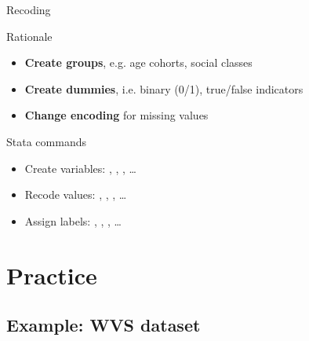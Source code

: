 \documentclass[t]{beamer}
\begin{document}
	\begin{frame}[t]{Recoding}
		
    \begin{block}{Rationale}

		\begin{itemize}
			\item \textbf{Create groups}, e.g. age cohorts, social classes
			\item \textbf{Create dummies}, i.e. binary (0/1), true/false indicators
			\item \textbf{Change encoding} for missing values
		\end{itemize}
    
    \end{block}
    	
    \begin{block}{Stata commands}
    
	    \begin{itemize}
	      \item Create variables: , , , …
	      \item Recode values: , , , …
	      \item Assign labels: , , , …
	    \end{itemize}

    \end{block}
	\end{frame}

	\section{Practice}
		
	\subsection{Example: WVS dataset}
	
\end{document}

